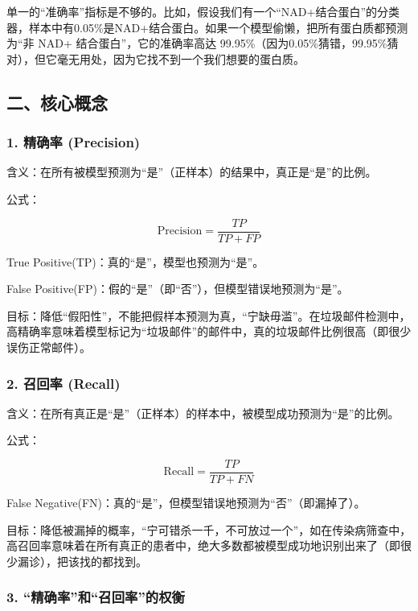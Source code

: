 单一的``准确率''指标是不够的。比如，假设我们有一个``NAD+结合蛋白''的分类器，样本中有0.05\%是NAD+结合蛋白。如果一个模型偷懒，把所有蛋白质都预测为``非 NAD+ 结合蛋白''，它的准确率高达 99.95\%（因为0.05\%猜错，99.95\%猜对），但它毫无用处，因为它找不到一个我们想要的蛋白质。

\hypertarget{ux4e8cux6838ux5fc3ux6982ux5ff5}{%
\subsection{二、核心概念}\label{ux4e8cux6838ux5fc3ux6982ux5ff5}}

\hypertarget{ux7cbeux786eux7387-precision}{%
\subsubsection{1. 精确率 (Precision)}\label{ux7cbeux786eux7387-precision}}

含义：在所有被模型预测为``是''（正样本）的结果中，真正是``是''的比例。

公式：

\[
\mathrm{Precision}=\frac{TP}{TP+FP}
\]

True Positive(TP)：真的``是''，模型也预测为``是''。

False Positive(FP)：假的``是''（即``否''），但模型错误地预测为``是''。

目标：降低``假阳性''，不能把假样本预测为真，``宁缺毋滥''。在垃圾邮件检测中，高精确率意味着模型标记为``垃圾邮件''的邮件中，真的垃圾邮件比例很高（即很少误伤正常邮件）。

\hypertarget{ux53ecux56deux7387-recall}{%
\subsubsection{2. 召回率 (Recall)}\label{ux53ecux56deux7387-recall}}

含义：在所有真正是``是''（正样本）的样本中，被模型成功预测为``是''的比例。

公式：

\[
\mathrm{Recall}=\frac{TP}{TP+FN}
\]

False Negative(FN)：真的``是''，但模型错误地预测为``否''（即漏掉了）。

目标：降低被漏掉的概率，``宁可错杀一千，不可放过一个''，如在传染病筛查中，高召回率意味着在所有真正的患者中，绝大多数都被模型成功地识别出来了（即很少漏诊），把该找的都找到。

\hypertarget{ux7cbeux786eux7387ux548cux53ecux56deux7387ux7684ux6743ux8861}{%
\subsubsection{3. ``精确率''和``召回率''的权衡}\label{ux7cbeux786eux7387ux548cux53ecux56deux7387ux7684ux6743ux8861}}

